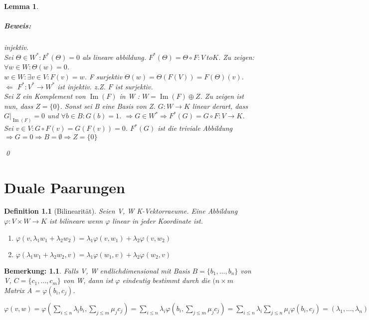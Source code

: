 \documentclass{report}
\newcommand{\lb}{\lambda}
\newcommand{\ve}[1]{{\begin{pmatrix}#1 \end{pmatrix}}}
\DeclareMathOperator{\Ima}{Im}
\theoremstyle{customrem}
\newtheorem*{bemerkung}{Bemerkung\textnormal:}
\theoremstyle{customdef}
\newtheorem{definition}{Definition}[chapter]
\newtheorem{lemma}[definition]{Lemma}
\renewenvironment{proof}{\paragraph{Beweis: }}{\qed}
\theoremstyle{customenv}
\begin{document}
\begin{lemma}
\begin{proof}
\begin{enumerate}
{        injektiv.\\
        Sei \(\Theta \in W^* : F^*(\Theta) = 0\) als lineare abbildung.
        \(F^*(\Theta) = \Theta \circ F : V \ to K\). Zu zeigen:
        \(\forall w\in W : \Theta(w) = 0\).\\
        \(w \in W : \exists v \in V : F(v) = w\). F surjektiv
        \(\Theta(w) = \Theta(F(V)) = F(\Theta)(v)\).\\
        \(\Leftarrow\)
        \(F^* : V^* \to W^*\) ist injektiv. z.Z. \(F\) ist surjektiv.\\
        Sei Z ein Komplement von \(\Ima(F)\) in W : \(W = \Ima(F) \oplus Z\).
        Zu zeigen ist nun, dass \(Z = \{0\}\). Sonst sei B eine Basis von Z.
        \(G : W \to K\) linear derart, dass \(G |_{\Ima(F)} = 0\) und
        \(\forall b \in B : G(b) = 1\). \(\Rightarrow G \in W^* \Rightarrow
        F^*(G) = G \circ F : V \to K\). Sei
        \(v \in V : G \circ F(v) = G(F(v)) = 0\). \(F^*(G)\) ist die
        triviale Abbildung \(\Rightarrow G = 0 \Rightarrow B = \emptyset
        \Rightarrow Z = \{0\}\)
      }
      
    \end{enumerate}
  \end{proof}
\end{lemma}

\chapter{Duale Paarungen}
\begin{definition}[Bilinearit\"at]
  Seien V, W K-Vektorraeume. Eine Abbildung \(\varphi : V \times W \to K\) ist
  bilineare wenn \(\varphi\) linear in jeder Koordinate ist.
  \begin{enumerate}
    \item{
      \(\varphi(v, \lb_1 w_1 + \lb_2 w_2)
      = \lb_1 \varphi(v, w_1) + \lb_2 \varphi(v, w_2)\)
    }
    \item{
      \(\varphi(\lb_1 w_1 + \lb_2 w_2, v)
      = \lb_1 \varphi(w_1, v) + \lb_2 \varphi(w_2, v)\)
    }
  \end{enumerate}
\end{definition}

\begin{bemerkung}
  Falls V, W endlichdimensional mit Basis \(B = \{b_1, \dots, b_n\}\) von V,
  \(C = \{c_1, \dots, c_m\}\) von W, dann ist \(\varphi\) eindeutig bestimmt
  durch die \((n \times m\) Matrix A = \(\varphi(b_i, c_j)\).\\
  \(\varphi(v, w) = \varphi(\sum_{i\le n}\lb_i b_i, \sum_{j \le m}\mu_j c_j)
  = \sum_{i \le n} \lb_i \varphi(b_i, \sum_{j \le m}\mu_j c_j)
  = \sum_{i \le n} \lb_i \sum_{j \le n} \mu_i \varphi(b_i, c_j)
  = (\lb_1, \dots, \lb_n) A \ve{\mu_1 \\ \vdots \\ \mu_m}
  \)
\end{bemerkung}
\end{document}
